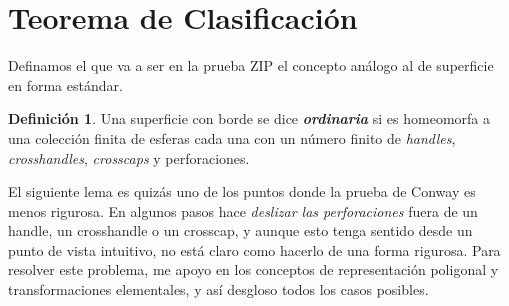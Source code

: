 \documentclass[10pt]{report}
\newcommand{\enfatiza}[1]{\textbf{\textit{#1}}}
\theoremstyle{definition}
\newtheorem{defin}{Definición}[section]
\begin{document}
\section{Teorema de Clasificación}

Definamos el que va a ser en la prueba ZIP el concepto análogo al de superficie en forma estándar.

\begin{defin}%
Una superficie con borde se dice \enfatiza{ordinaria} si es homeomorfa a una colección finita de esferas cada una con un número finito de \textit{handles}, \textit{crosshandles}, \textit{crosscaps} y perforaciones.
\end{defin}

El siguiente lema es quizás uno de los puntos donde la prueba de Conway es menos rigurosa. En algunos pasos hace \textit{deslizar las perforaciones} fuera de un handle, un crosshandle o un crosscap, y aunque esto tenga sentido desde un punto de vista intuitivo, no está claro como hacerlo de una forma rigurosa. Para resolver este problema, me apoyo en los conceptos de representación poligonal y transformaciones elementales, y así desgloso todos los casos posibles.
\end{document}

